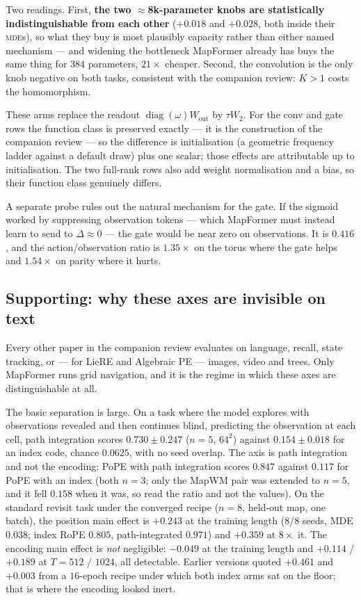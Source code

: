 \documentclass[11pt]{article}
\begin{document}
\noindent Two readings. First, \textbf{the two $\approx$8k-parameter knobs are
statistically indistinguishable from each other} ($+0.018$ and $+0.028$, both inside
their \textsc{mde}s), so what they buy is most plausibly capacity rather than either
named mechanism --- and widening the bottleneck MapFormer already has buys the same
thing for $384$ parameters, $21\times$ cheaper. Second, the convolution is the only
knob negative on both tasks, consistent with the companion review: $K>1$ costs the
homomorphism.

These arms replace the readout $\operatorname{diag}(\omega)W_{\mathrm{out}}$
by $\tau W_2$. For the conv and gate rows the function class is preserved exactly ---
it is the construction of the companion review --- so the difference is initialisation
(a geometric frequency ladder against a default draw) plus one scalar; those effects
are attributable up to initialisation. The two full-rank rows also add weight
normalisation and a bias, so their function class genuinely differs.

A separate probe rules out the natural mechanism for the gate. If the sigmoid worked
by suppressing observation tokens --- which MapFormer must instead learn to send to
$\Delta\approx0$ --- the gate would be near zero on observations. It is $0.416$, and
the action/observation ratio is $1.35\times$ on the torus where the gate helps and
$1.54\times$ on parity where it hurts.

\subsection{Supporting: why these axes are invisible on text}
\label{sec:navigation}

Every other paper in the companion review evaluates on language, recall, state tracking,
or --- for LieRE and Algebraic PE --- images, video and trees. Only MapFormer runs grid
navigation, and it is the regime in which these axes are distinguishable at all.

The basic separation is large. On a task where the model explores with observations
revealed and then continues blind, predicting the observation at each cell, path
integration scores $0.730 \pm 0.247$ ($n=5$, $64^2$) against $0.154 \pm 0.018$ for an
index code, chance $0.0625$, with no seed overlap. The axis is path integration and not
the encoding: PoPE with path integration scores $0.847$ against $0.117$ for PoPE with
an index (both $n=3$; only the MapWM pair was extended to $n=5$, and it fell $0.158$
when it was, so read the ratio and not the values). On the standard revisit task under
the converged recipe ($n=8$, held-out map, one batch), the position main effect is
$+0.243$ at the training length (8/8 seeds, MDE $0.038$; index RoPE $0.805$,
path-integrated $0.971$) and $+0.359$ at $8\times$ it. The encoding main effect is
\emph{not} negligible: $-0.049$ at the training length and $+0.114$ / $+0.189$ at
$T=512$ / $1024$, all detectable. Earlier versions quoted $+0.461$ and $+0.003$ from a
$16$-epoch recipe under which both index arms sat on the floor; that is where the
encoding looked inert.
\end{document}
